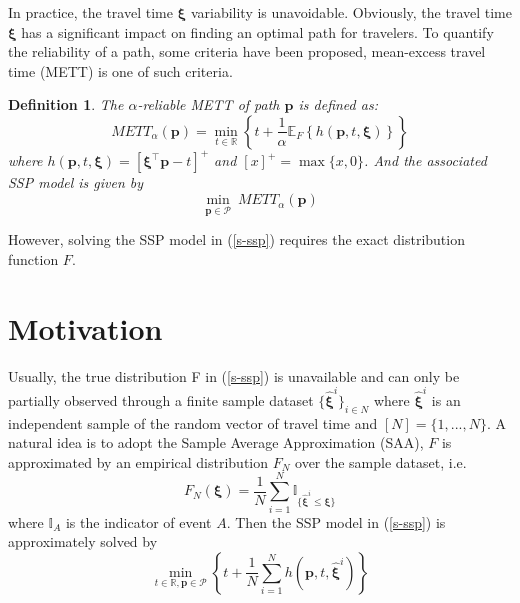 \documentclass{article}
\newtheorem{defin}{Definition}
\begin{document}
In practice, the travel time $\bm{\xi}$ variability is unavoidable. Obviously, the travel time $\bm{\xi}$ has a significant impact on finding an optimal path for travelers.  To quantify the reliability of a path, some criteria have been proposed, mean-excess travel time (METT) is one of such criteria.

\begin{defin}
	The $\alpha$-reliable METT of path $\bm{p}$ is defined as:
	\begin{equation}
		METT_{\alpha} (\bm{p}) = \min_{t \in \mathbb{R}} \left\{t + \frac{1}{\alpha} \mathbb{E}_{F}\left\{h(\bm{p}, t, \bm{\xi})\right\} \right\}
	\end{equation} 
	where $h(\bm{p}, t, \bm{\xi}) = [\bm{\xi}^\top\bm{p} - t]^+$ and $[x]^+ = \max\{x, 0\}$. And the associated SSP model is given by
	\begin{equation} \label{s-ssp}
		\min_{\bm{p} \in \mathcal{P}} \ METT_{\alpha} (\bm{p})
	\end{equation} 
\end{defin}

However, solving the SSP model in (\ref{s-ssp}) requires the exact distribution function $F$. 

\section{Motivation}

Usually, the true distribution F in (\ref{s-ssp}) is unavailable and can only be partially observed through a finite sample dataset $\{\hat{\bm{\xi}}^i\}_{i \in N}$
where $\hat{\bm{\xi}}^i$ is an independent sample of the random vector of travel time and $[N]=\{1,...,N\}$. A natural idea is to adopt the Sample Average Approximation (SAA), $F$ is approximated by an empirical distribution $F_N$ over the sample dataset, i.e.
\begin{equation}
	F_N(\bm{\xi}) = \frac{1}{N} \sum_{i=1}^{N} \mathbb{I}_{\{\hat{\bm{\xi}}^i \leq \bm{\xi}\}}
\end{equation}
where $\mathbb{I}_A$ is the indicator of event $A$. Then the SSP model in (\ref{s-ssp}) is approximately solved by
\begin{equation} \label{saa}
	\min_{t \in \mathbb{R}, \bm{p} \in \mathcal{P}} \left\{t + \frac{1}{N} \sum_{i=1}^{N} h(\bm{p}, t, \hat{\bm{\xi}}^i)\right\} 
\end{equation}
\end{document}
